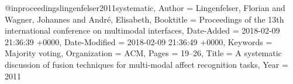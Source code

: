 @inproceedings{lingenfelser2011systematic,
	Author = {Lingenfelser, Florian and Wagner, Johannes and Andr{\'e}, Elisabeth},
	Booktitle = {Proceedings of the 13th international conference on multimodal interfaces},
	Date-Added = {2018-02-09 21:36:39 +0000},
	Date-Modified = {2018-02-09 21:36:49 +0000},
	Keywords = {Majority voting},
	Organization = {ACM},
	Pages = {19--26},
	Title = {A systematic discussion of fusion techniques for multi-modal affect recognition tasks},
	Year = {2011}
}
